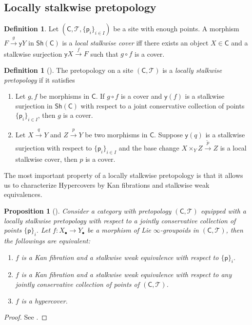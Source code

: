 \documentclass[12pt]{amsart}
\newtheorem{prop}[thm]{Proposition}
\theoremstyle{definition}
\newtheorem{defn}[thm]{Definition}
\theoremstyle{remark}
\numberwithin{equation}{section}
\newcommand{\CC}{{\mathsf C}}
\newcommand{\1}{{\mathbb{1}}}
\newcommand{\y}{\mathsf{y}}
\newcommand{\p}{\mathsf{p}}
\newcommand{\sh}{\mathsf{Sh}}
\newcommand{\bt}{\bullet}
\begin{document}
\subsection{Locally stalkwise pretopology}

\begin{defn}
Let $(\mathsf{C},\mathcal{T}, \{\p_i\}_{i\in I})$ be a site with enough points. A morphism $F\stackrel{g}{\to} \y Y$ in $\sh(\mathsf{C})$ is a {\it local stalkwise cover} iff there exists an object $X\in \mathsf{C}$ and a stalkwise surjection $\y X \stackrel{f}{\to} F$ such that $g\circ f $ is a cover.
\end{defn}


\begin{defn}[\cite{RZ20}]
The pretopology on a site $(\mathsf{C},\mathcal{T})$ is a {\it locally stalkwise pretopology} if it satisfies
\begin{enumerate}
	\item Let $g, f$ be morphisms in $\CC$. If $g\circ f$ is a cover and $\y(f)$ is a stalkwise surjection in $\sh(\mathsf{C})$ with respect to a joint conservative collection of points $\{\p_i\}_{i\in I}$, then $g$ is a cover.
	\item Let $X\stackrel{q}{\to} Y$ and $Z\stackrel{p}{\to} Y$ be two morphisms in $\mathsf{C}$. Suppose $\y (q)$ is a stalkwise surjection with respect to $\{\p_i\}_{i\in I}$ and the base change $X\times_Y Z \stackrel{\tilde{p}}{\to} Z$ is a local stalkwise cover, then $p$ is a cover.  
\end{enumerate}
\end{defn}
The most important property of a locally stalkwise pretopology is that it allows us to characterize Hypercovers by Kan fibrations and stalkwise weak equivalences.
\begin{prop}[\cite{RZ20}]
    Consider a category with pretopology $(\CC, \mathcal{T})$ equipped with a locally stalkwise pretopology with respect to a jointly conservative collection of points $\{\p\}_i$. Let $f: X_{\bt} \to Y_{\bt}$ be a morphism of Lie $\infty$-groupoids in $(\CC, \mathcal{T})$, then the followings are equivalent:
    \begin{enumerate}
        \item $f$ is a Kan fibration and a stalkwise weak equivalence with respect to $\{\p\}_i$.
        \item $f$ is a Kan fibration and a stalkwise weak equivalence with respect to any jointly conservative collection of points of $(\CC, \mathcal{T})$.
        \item $f$ is a hypercover.
    \end{enumerate}
\end{prop}
\begin{proof}
    See \cite[Proposition 6.7]{RZ20}.
\end{proof}
\end{document}
